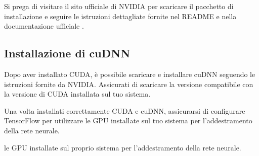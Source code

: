 \documentclass{article}
\begin{document}
Si prega di visitare il sito ufficiale di NVIDIA per scaricare il pacchetto di installazione e seguire le istruzioni dettagliate fornite nel README e nella documentazione ufficiale \cite{nvidia-installation-guide}.


\subsection{Installazione di cuDNN}
Dopo aver installato CUDA, è possibile scaricare e installare cuDNN seguendo le istruzioni fornite da NVIDIA. Assicurati di scaricare la versione compatibile con la versione di CUDA installata sul tuo sistema.

Una volta installati correttamente CUDA e cuDNN, assicurarsi di configurare TensorFlow per utilizzare le GPU installate sul tuo sistema per l'addestramento della rete neurale.

\printbibliography[heading=subbibliography, title={Bibliografia}] le GPU installate sul proprio sistema per l'addestramento della rete neurale.
\end{document}
